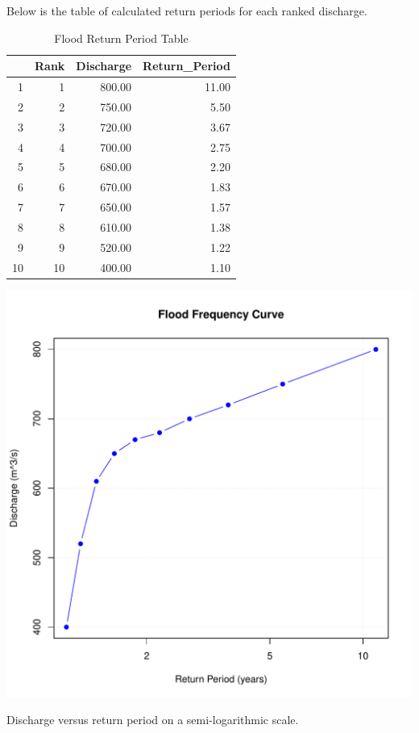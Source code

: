 \documentclass{tufte-handout}\usepackage[]{graphicx}\usepackage[]{xcolor}
\makeatletter
\def\maxwidth{ %
  \ifdim\Gin@nat@width>\linewidth
    \linewidth
  \else
    \Gin@nat@width
  \fi
}
\newenvironment{knitrout}{}{} %
\makeatother
\begin{document}
Below is the table of calculated return periods for each ranked discharge.

\begin{table}[ht]
\centering
\begin{tabular}{rrrr}
  \hline
 & Rank & Discharge & Return\_Period \\ 
  \hline
1 &   1 & 800.00 & 11.00 \\ 
  2 &   2 & 750.00 & 5.50 \\ 
  3 &   3 & 720.00 & 3.67 \\ 
  4 &   4 & 700.00 & 2.75 \\ 
  5 &   5 & 680.00 & 2.20 \\ 
  6 &   6 & 670.00 & 1.83 \\ 
  7 &   7 & 650.00 & 1.57 \\ 
  8 &   8 & 610.00 & 1.38 \\ 
  9 &   9 & 520.00 & 1.22 \\ 
  10 &  10 & 400.00 & 1.10 \\ 
   \hline
\end{tabular}
\caption{Flood Return Period Table} 
\end{table}



\begin{marginfigure}
\begin{knitrout}
\color{fgcolor}
\includegraphics[width=\maxwidth]{figure/flood_plot-1} 
\end{knitrout}
\caption{Discharge versus return period on a semi-logarithmic scale.}
\end{marginfigure}
\end{document}
